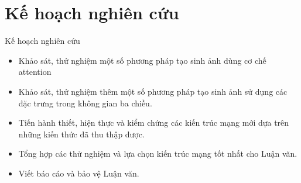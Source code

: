 \section{Kế hoạch nghiên cứu}\label{sec:intro}
\frame{\tableofcontents[currentsection]}
\begin{frame}{Kế hoạch nghiên cứu}

\begin{itemize}
    \item Khảo sát, thử nghiệm một số phương pháp tạo sinh ảnh dùng cơ chế attention
    \item Khảo sát, thử nghiệm thêm một số phương pháp tạo sinh ảnh sử dụng các đặc trưng trong không gian ba chiều.
    \item Tiến hành thiết, hiện thực và kiểm chứng các kiến trúc mạng mới dựa trên những kiến thức đã thu thập được.
    \item Tổng hợp các thử nghiệm và lựa chọn kiến trúc mạng tốt nhất cho Luận văn.
    \item Viết báo cáo và bảo vệ Luận văn.
\end{itemize}
\end{frame}
